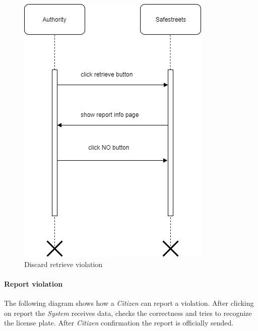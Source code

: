 \documentclass{article}
\begin{document}
\begin{figure}[H]
    \centering
    \includegraphics[scale=0.4]{img/sequence_diagrams/discard_retrieve_violation.png}
    \caption{Discard retrieve violation}
\end{figure}

\clearpage

\paragraph{Report violation}
The following diagram shows how a \textit{Citizen} can report a violation. After clicking on report the 
\textit{System} receives data, checks the correctness and tries to recognize the license plate. After \textit{Citizen} 
confirmation the report is officially sended. 
\end{document}
